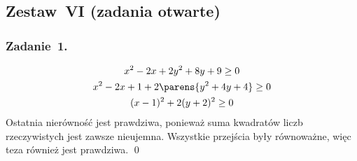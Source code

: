 \subsection*{Zestaw~VI (zadania otwarte)}
\subsubsection*{Zadanie~1.}
\begin{gather*}
    x^2 - 2x + 2y^2 + 8y + 9 \geq 0\\
    x^2 - 2x + 1 + 2\parens{y^2 + 4y + 4} \geq 0\\
    (x - 1)^2 + 2(y + 2)^2 \geq 0
\end{gather*}
Ostatnia nierówność jest prawdziwa, ponieważ suma kwadratów liczb rzeczywistych jest zawsze nieujemna. Wszystkie przejścia były równoważne, więc teza również jest prawdziwa.
\qed
